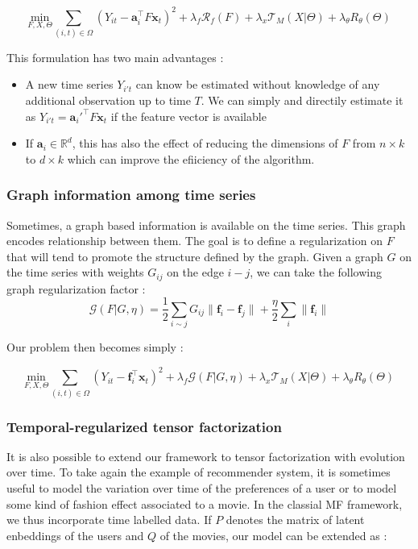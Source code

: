 \documentclass{article}
\begin{document}
\begin{equation}
\underset{F,X,\Theta}{\text{min}} \sum_{(i,t) \in \Omega} (Y_{it} - \mathbf{a}_i^\top F \mathbf{x}_t)^2 + \lambda_f \mathcal{R}_f(F) + \lambda_x \mathcal{T}_M(X | \Theta) + \lambda_{\theta} R_{\theta}(\Theta)
\label{eq:model_feature}
\end{equation}

This formulation has two main advantages :
\begin{itemize}
\item A new time series $Y_{i't}$ can know be estimated without knowledge of any additional observation up to time $T$. We can simply and directily estimate it as $Y_{i't} = \mathbf{a}_i'^\top F \mathbf{x}_t$ if the feature vector is available
\item If $\mathbf{a}_i \in \mathbb{R}^d$, this has also the effect of reducing the dimensions of $F$ from $n \times k$ to $d \times k$ which can improve the efiiciency of the algorithm.
\end{itemize}

\subsubsection*{Graph information among time series}
Sometimes, a graph based information is available on the time series. This graph encodes relationship between them. The goal is to define a regularization on $F$ that will tend to promote the structure defined by the graph.
Given a graph $G$ on the time series with weights $G_{ij}$ on the edge $i-j$, we can take the following graph regularization factor :
$$\mathcal{G}(F|G,\eta) = \frac{1}{2}\sum_{i\sim j}G_{ij}\|\mathbf{f}_i - \mathbf{f}_j\| + \frac{\eta}{2}\sum_i \|\mathbf{f}_i\|$$

Our problem then becomes simply :

\begin{equation}
\underset{F,X,\Theta}{\text{min}} \sum_{(i,t) \in \Omega} (Y_{it} - \mathbf{f}_i^\top\mathbf{x}_t)^2 + \lambda_f \mathcal{G}(F|G,\eta) + \lambda_x \mathcal{T}_M(X | \Theta) + \lambda_{\theta} R_{\theta}(\Theta)
\label{eq:model_graph}
\end{equation}

\subsubsection*{Temporal-regularized tensor factorization}
It is also possible to extend our framework to tensor factorization with evolution over time. To take again the example of recommender system, it is sometimes useful to model the variation over time of the preferences of a user or to model some kind of fashion effect associated to a movie. In the classial MF framework, we thus incorporate time labelled data. If $P$ denotes the matrix of latent enbeddings of the users and $Q$ of the movies, our model can be extended as :
\end{document}
